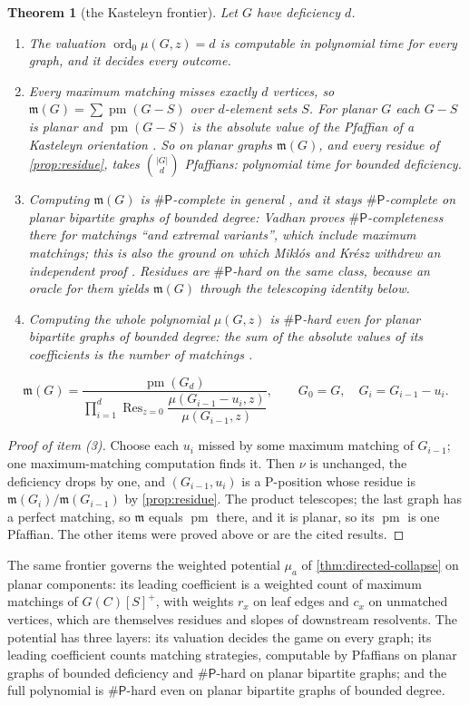\documentclass[11pt]{amsart}
\theoremstyle{plain}
\newtheorem{theorem}{Theorem}[section]
\theoremstyle{definition}
\theoremstyle{remark}
\numberwithin{equation}{section}
\newcommand{\mm}{\mathfrak{m}}            %
\newcommand{\ord}{\operatorname{ord}}
\newcommand{\Res}{\operatorname{Res}}
\newcommand{\cls}[1]{\mathsf{#1}}
\newcommand{\sharpP}{\#\cls{P}}
\begin{document}
\begin{theorem}[the Kasteleyn frontier]\label{thm:kasteleyn}
Let $G$ have deficiency $d$.
\begin{enumerate}[label=\textup{(\arabic*)}]
\item The valuation $\ord_0\mu(G,z)=d$ is computable in polynomial time for every graph, and it decides every outcome.
\item Every maximum matching misses exactly $d$ vertices, so $\mm(G)=\sum\operatorname{pm}(G-S)$ over $d$-element sets $S$. For planar $G$ each $G-S$ is planar and $\operatorname{pm}(G-S)$ is the absolute value of the Pfaffian of a Kasteleyn orientation \cite{TemperleyFisher,Kasteleyn}. So on planar graphs $\mm(G)$, and every residue of \cref{prop:residue}, takes $\binom{|G|}{d}$ Pfaffians: polynomial time for bounded deficiency.
\item Computing $\mm(G)$ is $\sharpP$-complete in general \cite{Valiant}, and it stays $\sharpP$-complete on planar bipartite graphs of bounded degree: Vadhan \cite{Vadhan} proves $\sharpP$-completeness there for matchings ``and extremal variants'', which include maximum matchings; this is also the ground on which Mikl\'os and Kr\'esz withdrew an independent proof \cite{MiklosKresz}. Residues are $\sharpP$-hard on the same class, because an oracle for them yields $\mm(G)$ through the telescoping identity below.
\item Computing the whole polynomial $\mu(G,z)$ is $\sharpP$-hard even for planar bipartite graphs of bounded degree: the sum of the absolute values of its coefficients is the number of matchings \cite{Jerrum,Vadhan}.
\end{enumerate}
\[
\mm(G)=\frac{\operatorname{pm}(G_d)}{\prod_{i=1}^{d}\Res_{z=0}\dfrac{\mu(G_{i-1}-u_i,z)}{\mu(G_{i-1},z)}},\qquad G_0=G,\quad G_i=G_{i-1}-u_i.
\]
\end{theorem}
\begin{proof}[Proof of item \textup{(3)}]
Choose each $u_i$ missed by some maximum matching of $G_{i-1}$; one maximum-matching computation finds it. Then $\nu$ is unchanged, the deficiency drops by one, and $(G_{i-1},u_i)$ is a P-position whose residue is $\mm(G_i)/\mm(G_{i-1})$ by \cref{prop:residue}. The product telescopes; the last graph has a perfect matching, so $\mm$ equals $\operatorname{pm}$ there, and it is planar, so its $\operatorname{pm}$ is one Pfaffian. The other items were proved above or are the cited results.
\end{proof}

The same frontier governs the weighted potential $\mu_a$ of \cref{thm:directed-collapse} on planar components: its leading coefficient is a weighted count of maximum matchings of $G(C)[S]^{+}$, with weights $r_x$ on leaf edges and $c_x$ on unmatched vertices, which are themselves residues and slopes of downstream resolvents. The potential has three layers: its valuation decides the game on every graph; its leading coefficient counts matching strategies, computable by Pfaffians on planar graphs of bounded deficiency and $\sharpP$-hard on planar bipartite graphs; and the full polynomial is $\sharpP$-hard even on planar bipartite graphs of bounded degree.
\end{document}

